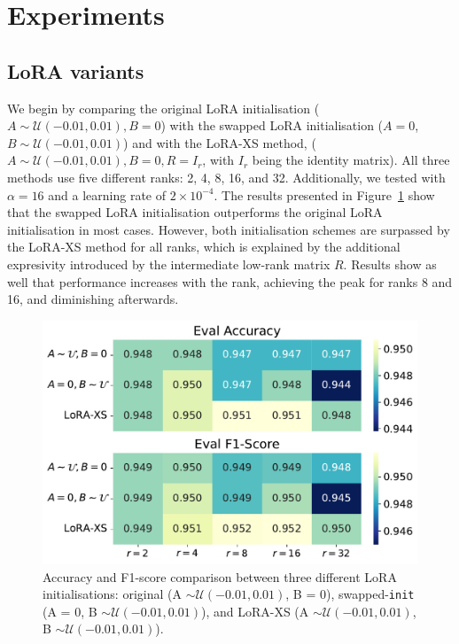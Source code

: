 \documentclass[a4paper,10pt,twocolumn,english]{article}
\begin{document}
\section{Experiments}

\subsection{LoRA variants}

We begin by comparing the original LoRA initialisation ($A \sim \mathcal{U}(-0.01, 0.01), B = 0$) with the swapped LoRA initialisation ($A = 0$, $B \sim \mathcal{U}(-0.01, 0.01)$) and with the LoRA-XS method, ($A \sim \mathcal{U}(-0.01, 0.01), B = 0, R = I_r$, with $I_r$ being the identity matrix). All three methods use five different ranks: 2, 4, 8, 16, and 32. Additionally, we tested with $\alpha = 16$ and a learning rate of $2 \times 10 ^ {-4}$. The results presented in Figure~\ref{fig:ba_init} show that the swapped LoRA initialisation outperforms the original LoRA initialisation in most cases. However, both initialisation schemes are surpassed by the LoRA-XS method for all ranks, which is explained by the additional expresivity introduced by the intermediate low-rank matrix $R$. Results show as well that performance increases with the rank, achieving the peak for ranks 8 and 16, and diminishing afterwards.

\begin{figure}[ht]
    \centering
    \includegraphics[width=1\linewidth]{../plots/ba_init_eval_acc_f1_heatmaps_final.pdf}
    \caption{Accuracy and F1-score comparison between three different LoRA initialisations: original (A $\sim \mathcal{U}(-0.01, 0.01)$, B = 0), swapped-\texttt{init} (A = 0, B $\sim \mathcal{U}(-0.01, 0.01)$), and LoRA-XS (A $\sim \mathcal{U}(-0.01, 0.01)$, B $\sim \mathcal{U}(-0.01, 0.01)$).}
    \label{fig:ba_init}
\end{figure}
\end{document}
